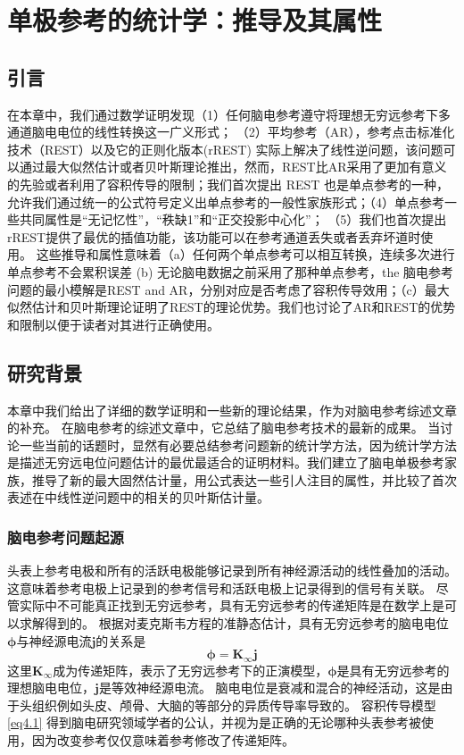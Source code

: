 \chapter{单极参考的统计学：推导及其属性}

\section{引言}
在本章中，我们通过数学证明发现（1）任何脑电参考遵守将理想无穷远参考下多通道脑电电位的线性转换这一广义形式； （2）平均参考（AR），参考点击标准化技术（REST）以及它的正则化版本(rREST) 实际上解决了线性逆问题，该问题可以通过最大似然估计或者贝叶斯理论推出，然而，REST比AR采用了更加有意义的先验或者利用了容积传导的限制；我们首次提出 REST 也是单点参考的一种，允许我们通过统一的公式符号定义出单点参考的一般性家族形式；（4）单点参考一些共同属性是“无记忆性”，“秩缺1”和“正交投影中心化”； （5）我们也首次提出rREST提供了最优的插值功能，该功能可以在参考通道丢失或者丢弃坏道时使用。
这些推导和属性意味着（a）任何两个单点参考可以相互转换，连续多次进行单点参考不会累积误差 (b) 无论脑电数据之前采用了那种单点参考，the 脑电参考问题的最小模解是REST and AR，分别对应是否考虑了容积传导效用；（c）最大似然估计和贝叶斯理论证明了REST的理论优势。我们也讨论了AR和REST的优势和限制以便于读者对其进行正确使用。

\section{研究背景}
本章中我们给出了详细的数学证明和一些新的理论结果，作为对脑电参考综述文章的补充。 在脑电参考的综述文章中，它总结了脑电参考技术的最新的成果。 当讨论一些当前的话题时，显然有必要总结参考问题新的统计学方法，因为统计学方法是描述无穷远电位问题估计的最优最适合的证明材料。我们建立了脑电单极参考家族，推导了新的最大固然估计量，用公式表达一些引人注目的属性，并比较了首次表述在\cite{hu_unified_2018}中线性逆问题中的相关的贝叶斯估计量。

\subsection{脑电参考问题起源}
头表上参考电极和所有的活跃电极能够记录到所有神经源活动的线性叠加的活动。这意味着参考电极上记录到的参考信号和活跃电极上记录得到的信号有关联。 尽管实际中不可能真正找到无穷远参考，具有无穷远参考的传递矩阵是在数学上是可以求解得到的。 根据对麦克斯韦方程的准静态估计，具有无穷远参考的脑电电位$\mathbf{\phi}$与神经源电流$\mathbf{j}$的关系是
\begin{equation}\label{eq4.1}
\mathbf{\phi}=\mathbf{K}_{\infty}\mathbf{j}
\end{equation}
这里$\mathbf{K}_{\infty}$成为传递矩阵，表示了无穷远参考下的正演模型，$\mathbf{\phi}$是具有无穷远参考的理想脑电电位，$\mathbf{j}$是等效神经源电流。 脑电电位是衰减和混合的神经活动，这是由于头组织例如头皮、颅骨、大脑的等部分的异质传导率导致的。 容积传导模型\eqref{eq4.1} 得到脑电研究领域学者的公认，并视为是正确的无论哪种头表参考被使用，因为改变参考仅仅意味着参考修改了传递矩阵。
